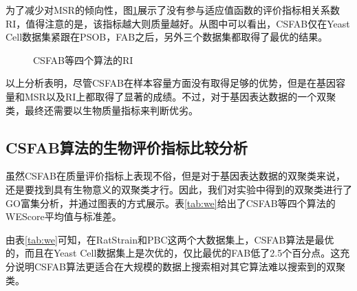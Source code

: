     为了减少对MSR的倾向性，图\ref{fig:ri}展示了没有参与适应值函数的评价指标相关系数RI，值得注意的是，该指标越大则质量越好。从图中可以看出，CSFAB仅在Yeast Cell数据集紧跟在PSOB，FAB之后，另外三个数据集都取得了最优的结果。

    \begin{figure}[htbp]
    \setlength{\subfigcapskip}{-1bp}
    \centering
    \begin{minipage}{.8\textwidth}
    \centering
    \subfigure{\label{fig:ri_bcll}}\addtocounter{subfigure}{-2}
    \hspace{.2em}
    \subfigure{\label{fig:ri_yc}}\addtocounter{subfigure}{-2}
    \end{minipage}
    \centering
    \begin{minipage}{.8\textwidth}
    \centering
    \hspace{.2em}
    \subfigure{\label{fig:ri_pbc}}\addtocounter{subfigure}{-2}
    \hspace{.2em}
    \subfigure{\label{fig:ri_rat}}\addtocounter{subfigure}{-2}
    \end{minipage}
    \vspace{0.2em}
    \caption{CSFAB等四个算法的RI}
    \label{fig:ri}
    \end{figure}

    以上分析表明，尽管CSFAB在样本容量方面没有取得足够的优势，但是在基因容量和MSR以及RI上都取得了显著的成绩。不过，对于基因表达数据的一个双聚类，最终还需要以生物质量指标来判断优劣。

    \subsection{CSFAB算法的生物评价指标比较分析}
    虽然CSFAB在质量评价指标上表现不俗，但是对于基因表达数据的双聚类来说，还是要找到具有生物意义的双聚类才行。因此，我们对实验中得到的双聚类进行了GO富集分析，并通过图表的方式展示。表\ref{tab:we}给出了CSFAB等四个算法的WEScore平均值与标准差。

    由表\ref{tab:we}可知，在RatStrain和PBC这两个大数据集上，CSFAB算法是最优的，而且在Yeast Cell数据集上是次优的，仅比最优的FAB低了2.5个百分点。这充分说明CSFAB算法更适合在大规模的数据上搜索相对其它算法难以搜索到的双聚类。

